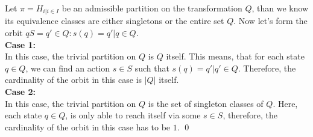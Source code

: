 \documentclass[a4paper,12pt,numbers=noenddot]{scrreport}
\begin{document}
Let $\pi = H_{i | i\in I}$ be an admissible partition on the transformation $Q$, than we know its equivalence classes are either singletons or the entire set $Q$. Now let's form the orbit $qS = {q' \in Q: s(q) = q' | q \in Q}$. \\
\textbf{Case 1:}\\
In this case, the trivial partition on $Q$ is $Q$ itself. This means, that for each state $q \in Q$, we can find an action $s \in S$ such that $s(q) = q' | q' \in Q$. Therefore, the cardinality of the orbit in this case is $|Q|$ itself.\\
\textbf{Case 2:}\\
In this case, the trivial partition on $Q$ is the set of singleton classes of $Q$. Here, each state $q \in Q$, is only able to reach itself via some $s \in S$, therefore, the cardinality of the orbit in this case has to be $1$.
\qed
\end{document}
